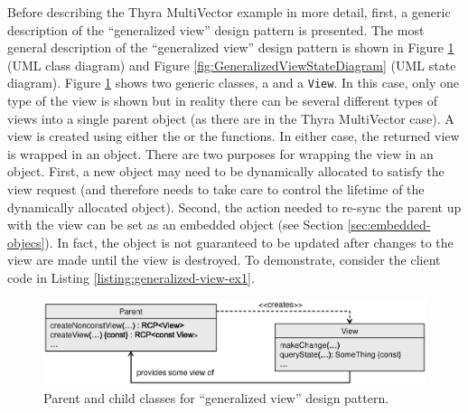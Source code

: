\documentclass[pdf,ps2pdf,11pt]{SANDreport}
\begin{document}
Before describing the Thyra MultiVector example in more detail, first,
a generic description of the ``generalized view'' design pattern is
presented.  The most general description of the ``generalized view''
design pattern is shown in Figure
{}\ref{fig:GeneralizedViewClassDiagram} (UML class diagram) and Figure
{}\ref{fig:GeneralizedViewStateDiagram} (UML state diagram).  Figure
{}\ref{fig:GeneralizedViewClassDiagram} shows two generic classes, a
{} and a {}\texttt{View}.  In this case, only one type of
the view is shown but in reality there can be several different types
of views into a single parent object (as there are in the Thyra
MultiVector case).  A view is created using either the
{} or the {} 
functions.  In either case, the returned view is wrapped in an
{} object.  There are two purposes for wrapping the view in
an {} object.  First, a new {} object may need to
be dynamically allocated to satisfy the view request (and therefore
needs {} to take care to control the lifetime of the
dynamically allocated object).  Second, the action needed to re-sync
the parent up with the view can be set as an embedded object (see
Section {}\ref{sec:embedded-objecs}).  In fact, the {}
object is not guaranteed to be updated after changes to the view are
made until the view is destroyed.  To demonstrate, consider the client
code in Listing {}\ref{listing:generalized-view-ex1}.


{\bsinglespace
\begin{figure}[p]
\begin{center}
\includegraphics*[angle=0,scale=0.65]{GeneralizedViewClassDiagram}
\end{center}
\caption{
\label{fig:GeneralizedViewClassDiagram}
Parent and child classes for ``generalized view'' design pattern.}
\end{figure}
\esinglespace}
\end{document}
